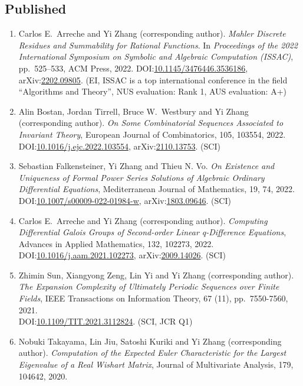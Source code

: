 \documentclass[a4paper,12pt]{article}
\begin{document}
\subsection*{Published}
\begin{enumerate}
\item Carlos E.\ Arreche and Yi Zhang (corresponding author). 
{\em Mahler Discrete Residues and Summability for Rational Functions}. In {\em Proceedings of the 2022 International Symposium on Symbolic and Algebraic Computation (ISSAC)}, 
pp.\ 525–533, ACM Press, 2022. DOI:\href{https://dl.acm.org/doi/10.1145/3476446.3536186}{10.1145/3476446.3536186},
arXiv:\href{https://arxiv.org/abs/2202.09805}{2202.09805}.  (EI, ISSAC is a top international conference in the field ``Algorithms and Theory'', NUS evaluation: Rank 1, AUS evaluation: A+) 
\item Alin Bostan, Jordan Tirrell, Bruce W.\ Westbury and Yi Zhang (corresponding author). 
{\em On Some Combinatorial Sequences Associated to Invariant Theory}, European Journal of Combinatorics, 105, 103554, 2022. 
DOI:\href{https://doi.org/10.1016/j.ejc.2022.103554}{10.1016/j.ejc.2022.103554}, 
 arXiv:\href{https://arxiv.org/abs/2110.13753}{2110.13753}.  (SCI)
\item Sebastian Falkensteiner, Yi Zhang and Thieu N. Vo. 
{\em On Existence and Uniqueness of Formal Power Series Solutions of Algebraic Ordinary
     Differential Equations},  Mediterranean Journal of Mathematics, 19, 74, 2022. 
DOI:\href{https://doi.org/10.1007/s00009-022-01984-w}{10.1007/s00009-022-01984-w}, 
arXiv:\href{https://arxiv.org/abs/1803.09646}{1803.09646}. (SCI) 
\item Carlos E.\ Arreche and Yi Zhang (corresponding author). 
{\em Computing Differential Galois Groups of Second-order Linear q-Difference Equations}, Advances in Applied Mathematics, 132, 102273, 2022. 
DOI:\href{https://doi.org/10.1016/j.aam.2021.102273}{10.1016/j.aam.2021.102273}, 
arXiv:\href{https://arxiv.org/abs/2009.14026}{2009.14026}. (SCI)
\item Zhimin Sun,  Xiangyong Zeng, Lin Yi and Yi Zhang (corresponding author). 
{\em The Expansion Complexity of Ultimately Periodic Sequences over Finite Fields},  IEEE Transactions on Information Theory, 67 (11), pp.\ 7550-7560, 2021. \\ 
DOI:\href{https://doi.org/10.1109/TIT.2021.3112824}{10.1109/TIT.2021.3112824}. (SCI, JCR Q1)
 \item Nobuki Takayama, Lin Jiu, Satoshi Kuriki and Yi Zhang (corresponding author). 
 {\em Computation of the Expected Euler Characteristic for the Largest Eigenvalue of a Real Wishart Matrix}, Journal of Multivariate Analysis, 179, 104642, 2020. \\

\end{enumerate}
\end{document}
